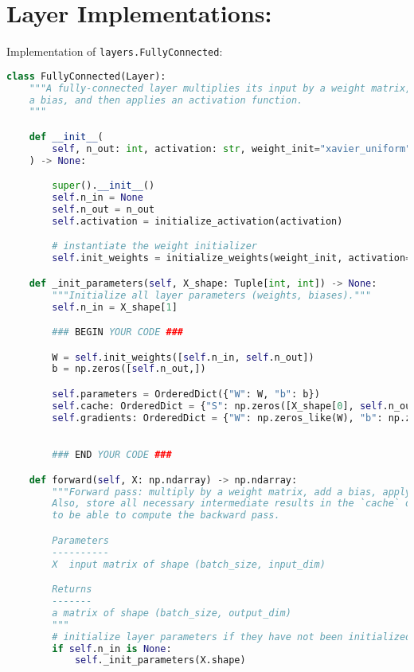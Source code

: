 \section{Layer Implementations:}

Implementation of \texttt{layers.FullyConnected}:

\begin{lstlisting}[language=Python]
class FullyConnected(Layer):
    """A fully-connected layer multiplies its input by a weight matrix, adds
    a bias, and then applies an activation function.
    """

    def __init__(
        self, n_out: int, activation: str, weight_init="xavier_uniform"
    ) -> None:

        super().__init__()
        self.n_in = None
        self.n_out = n_out
        self.activation = initialize_activation(activation)

        # instantiate the weight initializer
        self.init_weights = initialize_weights(weight_init, activation=activation)

    def _init_parameters(self, X_shape: Tuple[int, int]) -> None:
        """Initialize all layer parameters (weights, biases)."""
        self.n_in = X_shape[1]

        ### BEGIN YOUR CODE ###

        W = self.init_weights([self.n_in, self.n_out])
        b = np.zeros([self.n_out,])

        self.parameters = OrderedDict({"W": W, "b": b})
        self.cache: OrderedDict = {"S": np.zeros([X_shape[0], self.n_out]), "X": np.zeros(X_shape)}  # cache for backprop
        self.gradients: OrderedDict = {"W": np.zeros_like(W), "b": np.zeros_like(b)}    # parameter gradients initialized to zero
                                                                                        # MUST HAVE THE SAME KEYS AS `self.parameters`

        ### END YOUR CODE ###

    def forward(self, X: np.ndarray) -> np.ndarray:
        """Forward pass: multiply by a weight matrix, add a bias, apply activation.
        Also, store all necessary intermediate results in the `cache` dictionary
        to be able to compute the backward pass.

        Parameters
        ----------
        X  input matrix of shape (batch_size, input_dim)

        Returns
        -------
        a matrix of shape (batch_size, output_dim)
        """
        # initialize layer parameters if they have not been initialized
        if self.n_in is None:
            self._init_parameters(X.shape)


\end{lstlisting}
